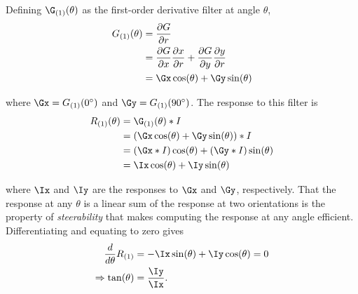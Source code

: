 \label{s:filtering_first_derivs_derivation}
%
Defining $\G_{(1)}(\theta)$ as the first-order derivative filter at angle $\theta$,
%
\begin{align}
G_{(1)}(\theta)
	&= 	\frac{\partial G}{\partial r} \\
	&= 	\frac{\partial G}{\partial x}\frac{\partial x}{\partial r} +
			\frac{\partial G}{\partial y}\frac{\partial y}{\partial r} \\
	&= 	\Gx \cos(\theta) + \Gy \sin(\theta)
\label{e:dG}
\end{align}

\noindent where $\Gx = G_{(1)}(0^\circ)$ and $\Gy = G_{(1)}(90^\circ)$. The response to this filter is
%
\begin{align}
R_{(1)}(\theta)
	&= 	\G_{(1)}(\theta) \ast I \\
	&=	(\Gx \cos(\theta) + \Gy \sin(\theta)) \ast I \\
	&=	(\Gx \ast I) \cos(\theta) + (\Gy \ast I) \sin(\theta) \\
	&=	\Ix \cos(\theta) + \Iy \sin(\theta)
\label{e:R1}
\end{align}

\noindent where $\Ix$ and $\Iy$ are the responses to $\Gx$ and $\Gy$, respectively. That the response at any $\theta$ is a linear sum of the response at two orientations is the property of \emph{steerability} that makes computing the response at any angle efficient. Differentiating and equating to zero gives
%
\begin{align}
\frac{d}{d\theta}R_{(1)}
	&= -\Ix \sin(\theta) + \Iy \cos(\theta) = 0 \\
\Rightarrow \tan(\theta)
	&= \frac{\Iy}{\Ix}.
\label{e:t1}
\end{align}
